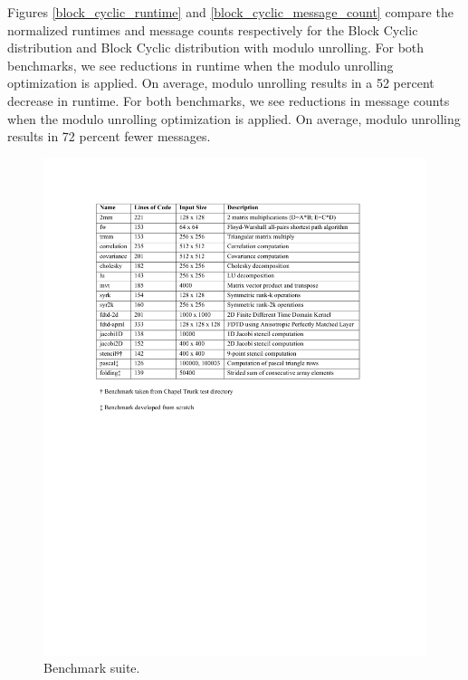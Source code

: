 Figures \ref{block_cyclic_runtime} and \ref{block_cyclic_message_count} compare the normalized runtimes and message counts respectively for the Block Cyclic distribution and Block Cyclic distribution with modulo unrolling. For both benchmarks, we see reductions in runtime when the modulo unrolling optimization is applied. On average, modulo unrolling results in a 52 percent decrease in runtime. For both benchmarks, we see reductions in message counts when the modulo unrolling optimization is applied. On average, modulo unrolling results in 72 percent fewer messages. 


\begin{figure}
	\begin{center}
	\includegraphics[scale=0.50]{./Figures/Benchmarks.pdf}
	\caption{Benchmark suite.}
	\label{benchmarks}
	\end{center}
\end{figure}


